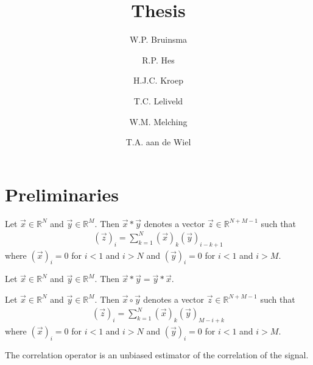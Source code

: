 \documentclass[a4paper, openany, oneside]{memoir}
\title{Thesis}
\author{W.P. Bruinsma \and R.P. Hes \and H.J.C. Kroep \and T.C. Leliveld \and W.M. Melching \and T.A. aan de Wiel}
\begin{document}
\frontmatter

\begin{titlingpage}
  \pagestyle{empty}
  \maketitle
\end{titlingpage}

\chapter{Preliminaries}
\begin{definition}[Convolution]
    Let $\vec{x} \in \mathbb{R}^N$ and $\vec{y} \in \mathbb{R}^M$. Then $\vec{x} \ast \vec{y}$ denotes a vector $\vec{z} \in \mathbb{R}^{N+M-1}$ such that
    \begin{align*}
        (\vec{z})_i = \sum_{k=1}^{N} (\vec{x})_k (\vec{y})_{i-k+1}
    \end{align*}
    where $(\vec{x})_i=0$ for $i < 1$ and $i > N$ and $(\vec{y})_i=0$ for $i < 1$ and $i > M$.
\end{definition}
\begin{theorem} \label{th:conv-comm}
    Let $\vec{x} \in \mathbb{R}^N$ and $\vec{y} \in \mathbb{R}^M$. Then $\vec{x} \ast \vec{y} = \vec{y} \ast \vec{x}$.
\end{theorem}
\begin{definition}[Correlation]
    Let $\vec{x} \in \mathbb{R}^N$ and $\vec{y} \in \mathbb{R}^M$. Then $\vec{x} \circ \vec{y}$ denotes a vector $\vec{z} \in \mathbb{R}^{N+M-1}$ such that
    \begin{align*}
        (\vec{z})_i = \sum_{k=1}^{N} (\vec{x})_k (\vec{y})_{M-i+k}
    \end{align*}
    where $(\vec{x})_i=0$ for $i < 1$ and $i > N$ and $(\vec{y})_i=0$ for $i < 1$ and $i > M$.
\end{definition}
\begin{theorem} \label{th:corr-unbiased}
    The correlation operator is an unbiased estimator of the correlation of the signal.
\end{theorem}
\end{document}
